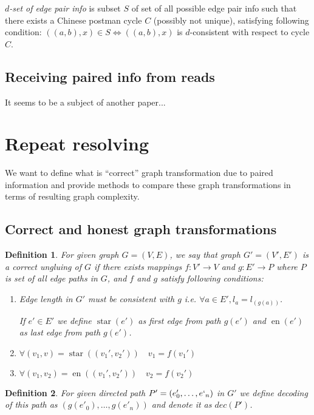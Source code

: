 \documentclass[12pt,a4paper,oneside]{article}
\newtheorem{definition}{Definition}
\begin{document}
\emph{$d$-set of edge pair info} is subset $S$ of set of all possible edge pair info such that there exists a Chinese postman cycle $C$ (possibly not unique), satisfying following condition:
 $((a, b), x) \in S \Leftrightarrow  ((a, b), x)$ is $d$-consistent with respect to cycle $C$.
  
\subsection{Receiving paired info from reads}
It seems to be a subject of another paper...
\section{Repeat resolving}
We want to define what is ``correct'' graph transformation due to paired information and provide methods to compare these graph transformations in terms of resulting graph complexity.

\subsection{Correct and honest graph transformations}
\begin{definition}
 
For given graph $G=(V, E)$, we say that graph $G' = (V', E')$  is a \emph{correct ungluing} of $G$ if there exists mappings $f: V' \rightarrow V$ and $g: E' \rightarrow P$ where $P$ is set of all edge paths in $G$, and $f$ and $g$
satisfy following conditions:
\begin{enumerate}

\item Edge length in $G'$ must be consistent with $g$ i.e. $\forall a\in E', l_a = l_{(g(a))}$. 

 If $e'\in E'$ we define $\mathop{start_e}(e')$ as first edge from path $g(e')$
 and $\mathop{end_e}(e')$ as last edge from path $g(e')$.


\item $\forall (v_1, v) = \mathop{start_e}((v_1', v_2')) \quad v_1 = f(v_1')$
\item $\forall (v_1, v_2) = \mathop{end_e}((v_1', v_2')) \quad v_2 = f(v_2')$
\end{enumerate}
\end{definition}

\begin{definition}
 

For given directed path $P' = (e'_0, \ldots, e`_n)$ in $G' $ we define \emph{decoding} of this path as $(g(e'_0), \ldots, g(e'_n))$ and denote it as $dec(P')$.
\end{definition}
\end{document}
